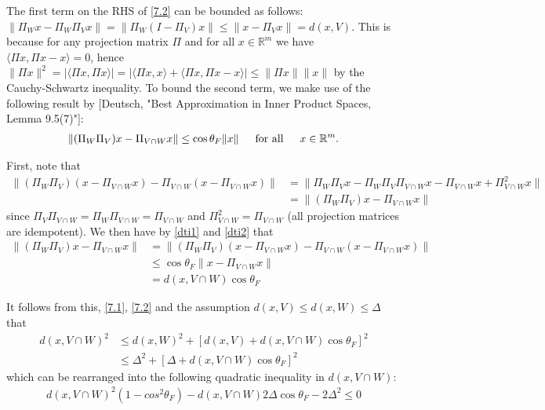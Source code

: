 \documentclass[journal,onecolumn]{IEEEtran}
\begin{document}
The first term on the RHS of \eqref{7.2}  can be bounded as follows: $\|\Pi_Wx - \Pi_W\Pi_V x\| = \|\Pi_W(I - \Pi_V)x\| \leq \|x - \Pi_Vx\| = d(x,V)$. This is because for any projection matrix $\Pi$ and for all $x \in \mathbb{R}^m$ we have $\langle \Pi x,\Pi x - x \rangle = 0$, hence $\|\Pi x\|^2 = | \langle \Pi x, \Pi x \rangle | = | \langle \Pi x, x \rangle + \langle \Pi x, \Pi x - x \rangle | \leq \|\Pi x\|\|x\|$ by the Cauchy-Schwartz inequality. To bound the second term, we make use of the following result by [Deutsch, "Best Approximation in Inner Product Spaces, Lemma 9.5(7)"]:
\begin{align}\label{dti2}
\|(\Pi_W\Pi_V)x - \Pi_{V \cap W}x\| \leq \cos\theta_F\|x\| \indent \text{for all} \indent x \in \mathbb{R}^m.
\end{align}

First, note that
\begin{align}\label{dti1}
\|(\Pi_W\Pi_V)(x - \Pi_{V \cap W}x) - \Pi_{V \cap W}(x - \Pi_{V \cap W}x)\| 
&= \| \Pi_W \Pi_V x - \Pi_W \Pi_V \Pi_{V \cap W} x - \Pi_{V \cap W} x + \Pi_{V \cap W}^2 x \| \nonumber \\
&= \|(\Pi_W \Pi_V) x - \Pi_{V \cap W} x \|
\end{align}
%
since $\Pi_V \Pi_{V \cap W} = \Pi_W \Pi_{V \cap W} = \Pi_{V \cap W}$ and $\Pi_{V \cap W}^2 = \Pi_{V \cap W}$ (all projection matrices are idempotent). We then have by \eqref{dti1} and \eqref{dti2} that
\begin{align*}
\|(\Pi_W \Pi_V) x - \Pi_{V \cap W} x \| 
&= \|(\Pi_W\Pi_V)(x - \Pi_{V \cap W}x) - \Pi_{V \cap W}(x - \Pi_{V \cap W}x)\| \\
&\leq \cos\theta_F \|x - \Pi_{V \cap W}x\| \\
&= d(x, V \cap W) \cos\theta_F 
\end{align*}

It follows from this, \eqref{7.1}, \eqref{7.2} and the assumption $d(x,V) \leq d(x,W) \leq \Delta$ that
\begin{align*}
d(x, V \cap W)^2 &\leq d(x, W)^2 + \left[ d(x, V) + d(x, V \cap W) \cos\theta_F \right]^2 \\
&\leq \Delta^2 + \left[ \Delta + d(x, V \cap W) \cos\theta_F \right]^2
\end{align*}
%
which can be rearranged into the following quadratic inequality in $d(x, V \cap W)$:
\begin{align}\label{quadineq}
d(x, V \cap W)^2 \left( 1 - cos^2\theta_F \right)  - d(x, V \cap W) 2 \Delta \cos\theta_F - 2 \Delta^2 \leq 0
\end{align}
\end{document}
